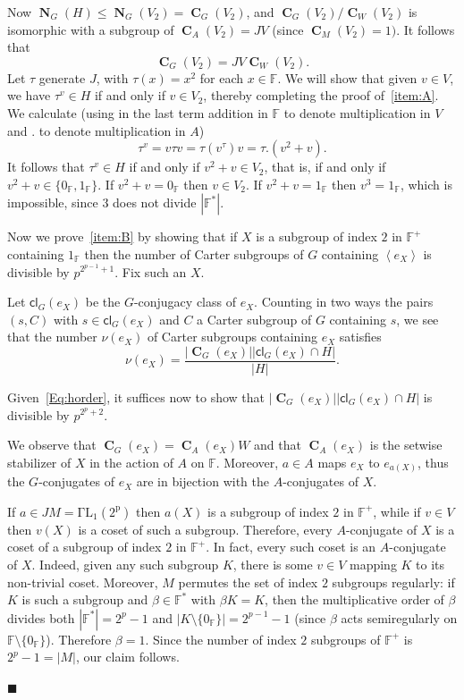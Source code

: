 \documentclass[10pt,a4paper]{amsart}
\numberwithin{equation}{section}
\DeclareMathOperator{\N}{\mathbf{N}}
\DeclareMathOperator{\cent}{\mathbf{C}}
\newcommand{\gensub}[1]{\left\langle{#1}\right\rangle}
\newcommand{\card}[1]{\left\lvert{#1}\right\rvert}
\renewcommand{\leq}{\leqslant}
\newenvironment{proofof}{{\bf {Proof.} }}{\hfill $\blacksquare$ \\}
\def\ff{{\mathbb F}}
\def\cl{{\mathsf{c}\mathsf{l}}}
\begin{document}
\begin{proofof}
Now $\N_G(H) \leq \N_G(V_2) = \cent_G(V_2)$, 
and $\cent_G(V_2)/\cent_W(V_2)$ is isomorphic with a subgroup of $\cent_A(V_2) = JV$ (since $\cent_M(V_2) = 1)$.  
It follows that
\[
\cent_G(V_2) = JV\cent_W(V_2).
\]
Let $\tau$ generate $J$, with $\tau(x) = x^2$ for each $x \in \ff$.  
We will show that given $v \in V$, 
we have $\tau^v \in H$ if and only if $v \in V_2$, 
thereby completing the proof of~\ref{item:A}.  
We calculate 
(using in the last term addition in $\ff$ to denote multiplication in $V$ 
and $.$ to denote multiplication in $A$)
\[
\tau^v = v \tau v = \tau(v^\tau)v  =\tau.(v^2+v).
\]
It follows that $\tau^v \in H$ if and only if $v^2+v \in V_2$, 
that is, if and only if $v^2+v \in \{0_\ff,1_\ff\}$.  
If $v^2+v=0_\ff$ then $v \in V_2$.  
If $v^2+v=1_\ff$ then $v^3=1_\ff$, 
which is impossible, since $3$ does not divide $\card{\ff^\ast}$.

Now we prove~\ref{item:B} by showing that if $X$ is a subgroup of index $2$ in $\ff^+$ containing $1_\ff$ 
then the number of Carter subgroups of $G$ containing 
$\gensub{e_X}$ is divisible by $p^{2^{p-1}+1}$.  
Fix such an $X$.

Let $\cl_G(e_X)$ be the $G$-conjugacy class of $e_X$.  
Counting in two ways the pairs $(s,C)$ with $s \in \cl_G(e_X)$  
and $C$ a Carter subgroup of $G$ containing $s$, 
we see that the number $\nu(e_X)$ of Carter subgroups containing $e_X$ satisfies
\begin{equation}\label{pairs}
\nu(e_X) = \frac{\card{\cent_G(e_X)} \card{\cl_G(e_X) \cap H}}{|H|}.
\end{equation}

Given~\eqref{Eq:horder}, 
it suffices now to show that $\card{\cent_G(e_X)} \card{\cl_G(e_X) \cap H}$ is divisible by $p^{2^p+2}$.

We observe that $\cent_G(e_X) = \cent_A(e_X) W$ 
and that $\cent_A(e_X)$ is the setwise stabilizer of $X$ in the action of $A$ on $\ff$.  
Moreover, $a \in A$ maps $e_X$ to $e_{a(X)}$, 
thus the $G$-conjugates of $e_X$ are in bijection with the $A$-conjugates of $X$. 

If $a \in JM = \mathrm{\Gamma L_1(2^p)}$ then $a(X)$ is a subgroup of index $2$ in $\ff^+$, 
while if $v \in V$ then $v(X)$ is a coset of such a subgroup.  
Therefore, every $A$-conjugate of $X$ is a coset of a subgroup of index $2$ in $\ff^+$.  
In fact, every such coset is an $A$-conjugate of $X$.  
Indeed, given any such subgroup $K$, there is some $v \in V$ mapping $K$ to its non-trivial coset.  
Moreover, $M$ permutes the set of index $2$ subgroups regularly: 
if $K$ is such a subgroup and $\beta \in \ff^\ast$ with $\beta K = K$, 
then the multiplicative order of $\beta$ divides both $\card{\ff^\ast} = 2^p-1$ and $\card{K \setminus \{0_\ff\}} = 2^{p-1}-1$ 
(since $\beta$ acts semiregularly on $\ff \setminus \{0_\ff\}$).  
Therefore $\beta = 1$.  
Since the number of index $2$ subgroups of $\ff^+$ is $2^p-1 = |M|$, 
our claim follows.


\end{proofof}
\end{document}
